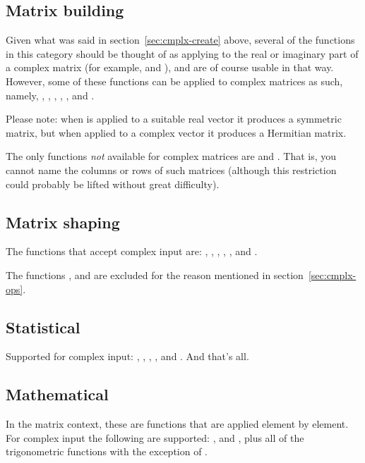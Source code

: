 \subsection{Matrix building}

Given what was said in section~\ref{sec:cmplx-create} above, several
of the functions in this category should be thought of as applying to
the real or imaginary part of a complex matrix (for example,
 and ), and are of course usable in that
way.  However, some of these functions can be applied to complex
matrices as such, namely, , ,
, , ,  and
.

Please note: when  is applied to a suitable real
vector it produces a symmetric matrix, but when applied to a complex
vector it produces a Hermitian matrix.

The only functions \textit{not} available for complex matrices are
 and . That is, you cannot name the
columns or rows of such matrices (although this restriction could
probably be lifted without great difficulty).

\subsection{Matrix shaping}

The functions that accept complex input are: ,
, , , ,
 and .

The functions ,  and  are
excluded for the reason mentioned in section~\ref{sec:cmplx-ops}.

\subsection{Statistical}

Supported for complex input: , ,
, ,  and . And
that's all.

\subsection{Mathematical}

In the matrix context, these are functions that are applied element by
element. For complex input the following are supported: ,
 and , plus all of the trigonometric
functions with the exception of .

